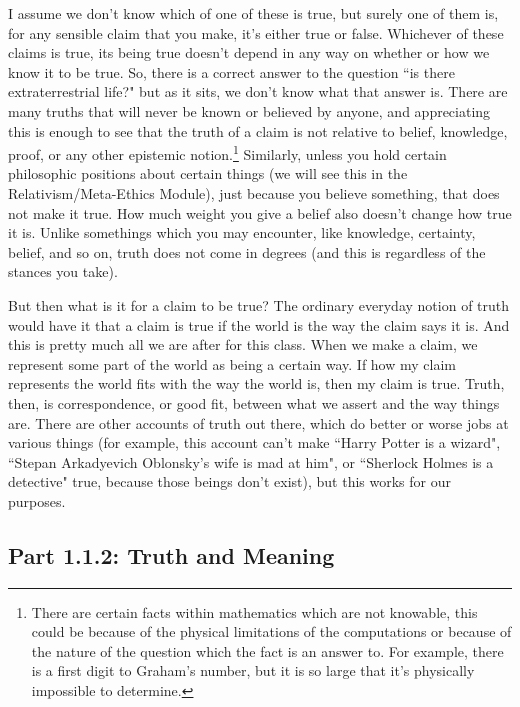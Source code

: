 I assume we don’t know which of one of these is true, but surely one of them is, for any sensible claim that you make, it's either true or false. Whichever of these claims is true, its being true doesn’t depend in any way on whether or how we know it to be true. So, there is a correct answer to the question ``is there extraterrestrial life?" but as it sits, we don't know what that answer is. There are many truths that will never be known or believed by anyone, and appreciating this is enough to see that the truth of a claim is not relative to belief, knowledge, proof, or any other epistemic notion.\footnote{There are certain facts within mathematics which are not knowable, this could be because of the physical limitations of the computations or because of the nature of the question which the fact is an answer to. For example, there is a first digit to Graham's number, but it is so large that it's physically impossible to determine.} Similarly, unless you hold certain philosophic positions about certain things (we will see this in the Relativism/Meta-Ethics Module), just because you believe something, that does not make it true. How much weight you give a belief also doesn't change how true it is. Unlike somethings which you may encounter, like knowledge, certainty, belief, and so on, truth does not come in degrees (and this is regardless of the stances you take). 

But then what is it for a claim to be true? The ordinary everyday notion of truth would have it that a claim is true if the world is the way the claim says it is. And this is pretty much all we are after for this class. When we make a claim, we represent some part of the world as being a certain way. If how my claim represents the world fits with the way the world is, then my claim is true. Truth, then, is correspondence, or good fit, between what we assert and the way things are. There are other accounts of truth out there, which do better or worse jobs at various things (for example, this account can't make ``Harry Potter is a wizard"\autocite{HarryPotter1}, ``Stepan Arkadyevich Oblonsky's wife is mad at him"\autocite{AnnaKarenina}, or ``Sherlock Holmes is a detective"\autocite{Sherlock} true, because those beings don't exist), but this works for our purposes.  

\subsection{Part 1.1.2: Truth and Meaning}
\label{s:p1.1.2}

